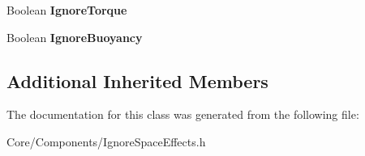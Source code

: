 \begin{DoxyCompactItemize}
\item 
\hypertarget{classDCEngine_1_1Components_1_1IgnoreSpaceEffects_a84174847b5f53b0bfcd45df8304b3113}{Boolean {\bfseries Ignore\-Torque}}\label{classDCEngine_1_1Components_1_1IgnoreSpaceEffects_a84174847b5f53b0bfcd45df8304b3113}

\item 
\hypertarget{classDCEngine_1_1Components_1_1IgnoreSpaceEffects_af3c85b851b323c0037746b0453918a55}{Boolean {\bfseries Ignore\-Buoyancy}}\label{classDCEngine_1_1Components_1_1IgnoreSpaceEffects_af3c85b851b323c0037746b0453918a55}

\end{DoxyCompactItemize}
\subsection*{Additional Inherited Members}


The documentation for this class was generated from the following file\-:\begin{DoxyCompactItemize}
\item 
Core/\-Components/Ignore\-Space\-Effects.\-h\end{DoxyCompactItemize}
